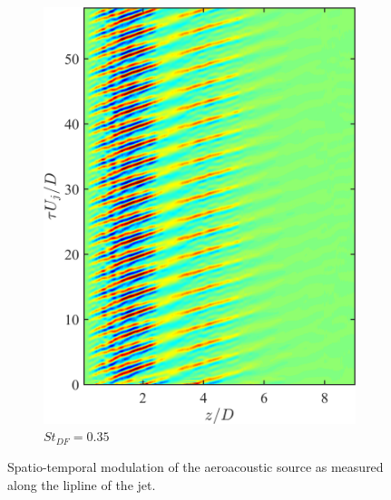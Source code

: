 \begin{figure}
\begin{subfigure}{0.33\textwidth}
		\includegraphics[width=0.95\linewidth]{Figures/ch5_St035_modulated_source.png}
		\caption{$St_{DF} = 0.35$}
	\end{subfigure}
	\caption{Spatio-temporal modulation of the aeroacoustic source as measured along the lipline of the jet.}
	\label{fig:jittering}
\end{figure}